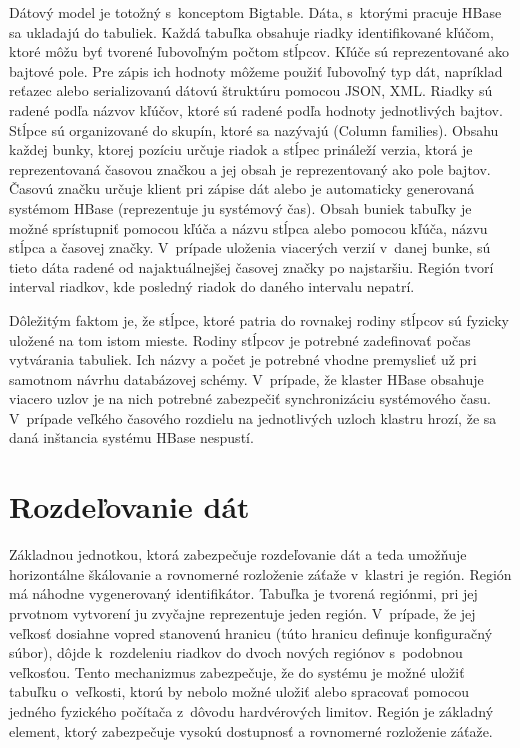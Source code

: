 \documentclass[11pt,twoside,a4paper]{book}
\begin{document}
Dátový model je totožný s~konceptom Bigtable. Dáta, s~ktorými pracuje HBase sa ukladajú do tabuliek. Každá tabuľka obsahuje riadky identifikované kľúčom, ktoré môžu byť tvorené ľubovoľným počtom stĺpcov. Kľúče sú reprezentované ako bajtové pole. Pre zápis ich hodnoty môžeme použiť ľubovoľný typ dát, napríklad reťazec alebo serializovanú dátovú štruktúru pomocou JSON, XML. Riadky sú radené podľa názvov kľúčov, ktoré sú radené podľa hodnoty jednotlivých bajtov. Stĺpce sú organizované do skupín, ktoré sa nazývajú  (Column families). Obsahu každej bunky, ktorej pozíciu určuje riadok a stĺpec prináleží verzia, ktorá je reprezentovaná časovou značkou a jej obsah je reprezentovaný ako pole bajtov. Časovú značku určuje klient pri zápise dát alebo je automaticky generovaná systémom HBase (reprezentuje ju systémový čas). Obsah buniek tabuľky je možné sprístupniť pomocou kľúča a názvu stĺpca alebo pomocou kľúča, názvu stĺpca a časovej značky. V~prípade uloženia viacerých verzií v~danej bunke, sú tieto dáta radené od najaktuálnejšej časovej značky po najstaršiu. Región tvorí interval riadkov, kde posledný riadok do daného intervalu nepatrí.

Dôležitým faktom je, že stĺpce, ktoré patria do rovnakej rodiny stĺpcov sú fyzicky uložené na tom istom mieste. Rodiny stĺpcov je potrebné zadefinovať počas vytvárania tabuliek. Ich názvy a počet je potrebné vhodne premyslieť už pri samotnom návrhu databázovej schémy. V~prípade, že klaster HBase obsahuje viacero uzlov je na nich potrebné zabezpečiť synchronizáciu systémového času. V~prípade veľkého časového rozdielu na jednotlivých uzloch klastru hrozí, že sa daná inštancia systému HBase nespustí.

\section{Rozdeľovanie dát}

Základnou jednotkou, ktorá zabezpečuje rozdeľovanie dát a teda umožňuje horizontálne škálovanie a rovnomerné rozloženie záťaže v~klastri je región. Región má náhodne vygenerovaný identifikátor. Tabuľka je tvorená regiónmi, pri jej prvotnom vytvorení ju zvyčajne reprezentuje jeden región. V~prípade, že jej veľkosť dosiahne vopred stanovenú hranicu (túto hranicu definuje konfiguračný súbor), dôjde k~rozdeleniu riadkov do dvoch nových regiónov s~podobnou veľkosťou. Tento mechanizmus zabezpečuje, že do systému je možné uložiť tabuľku o~veľkosti, ktorú by nebolo možné uložiť alebo spracovať pomocou jedného fyzického počítača z~dôvodu hardvérových limitov. Región je základný element, ktorý zabezpečuje vysokú dostupnosť a rovnomerné rozloženie záťaže.
\end{document}
